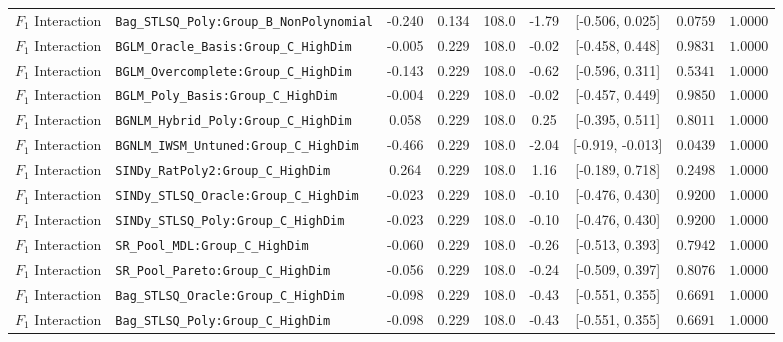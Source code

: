 \begin{table}[t]
\begin{tabular}{llccccccc}
$F_1$ Interaction & \texttt{Bag\_STLSQ\_Poly:Group\_B\_NonPolynomial} & -0.240 & 0.134 & 108.0 & -1.79 & [-0.506, 0.025] & $0.0759$ & $1.0000$ \\
$F_1$ Interaction & \texttt{BGLM\_Oracle\_Basis:Group\_C\_HighDim} & -0.005 & 0.229 & 108.0 & -0.02 & [-0.458, 0.448] & $0.9831$ & $1.0000$ \\
$F_1$ Interaction & \texttt{BGLM\_Overcomplete:Group\_C\_HighDim} & -0.143 & 0.229 & 108.0 & -0.62 & [-0.596, 0.311] & $0.5341$ & $1.0000$ \\
$F_1$ Interaction & \texttt{BGLM\_Poly\_Basis:Group\_C\_HighDim} & -0.004 & 0.229 & 108.0 & -0.02 & [-0.457, 0.449] & $0.9850$ & $1.0000$ \\
$F_1$ Interaction & \texttt{BGNLM\_Hybrid\_Poly:Group\_C\_HighDim} & 0.058 & 0.229 & 108.0 & 0.25 & [-0.395, 0.511] & $0.8011$ & $1.0000$ \\
$F_1$ Interaction & \texttt{BGNLM\_IWSM\_Untuned:Group\_C\_HighDim} & -0.466 & 0.229 & 108.0 & -2.04 & [-0.919, -0.013] & $0.0439$ & $1.0000$ \\
$F_1$ Interaction & \texttt{SINDy\_RatPoly2:Group\_C\_HighDim} & 0.264 & 0.229 & 108.0 & 1.16 & [-0.189, 0.718] & $0.2498$ & $1.0000$ \\
$F_1$ Interaction & \texttt{SINDy\_STLSQ\_Oracle:Group\_C\_HighDim} & -0.023 & 0.229 & 108.0 & -0.10 & [-0.476, 0.430] & $0.9200$ & $1.0000$ \\
$F_1$ Interaction & \texttt{SINDy\_STLSQ\_Poly:Group\_C\_HighDim} & -0.023 & 0.229 & 108.0 & -0.10 & [-0.476, 0.430] & $0.9200$ & $1.0000$ \\
$F_1$ Interaction & \texttt{SR\_Pool\_MDL:Group\_C\_HighDim} & -0.060 & 0.229 & 108.0 & -0.26 & [-0.513, 0.393] & $0.7942$ & $1.0000$ \\
$F_1$ Interaction & \texttt{SR\_Pool\_Pareto:Group\_C\_HighDim} & -0.056 & 0.229 & 108.0 & -0.24 & [-0.509, 0.397] & $0.8076$ & $1.0000$ \\
$F_1$ Interaction & \texttt{Bag\_STLSQ\_Oracle:Group\_C\_HighDim} & -0.098 & 0.229 & 108.0 & -0.43 & [-0.551, 0.355] & $0.6691$ & $1.0000$ \\
$F_1$ Interaction & \texttt{Bag\_STLSQ\_Poly:Group\_C\_HighDim} & -0.098 & 0.229 & 108.0 & -0.43 & [-0.551, 0.355] & $0.6691$ & $1.0000$ \\
\bottomrule
\end{tabular}
\end{table}
